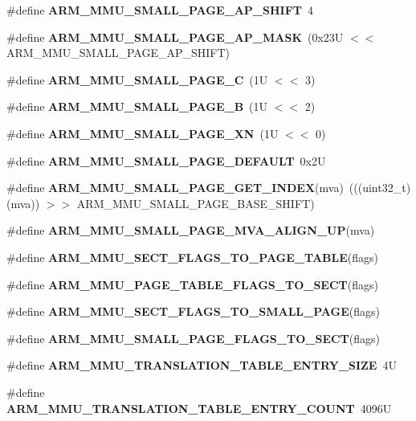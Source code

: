 \begin{Indent}
\begin{DoxyCompactItemize}
\item 
\#define {\bfseries A\+R\+M\+\_\+\+M\+M\+U\+\_\+\+S\+M\+A\+L\+L\+\_\+\+P\+A\+G\+E\+\_\+\+A\+P\+\_\+\+S\+H\+I\+FT}~4
\item 
\#define {\bfseries A\+R\+M\+\_\+\+M\+M\+U\+\_\+\+S\+M\+A\+L\+L\+\_\+\+P\+A\+G\+E\+\_\+\+A\+P\+\_\+\+M\+A\+SK}~(0x23\+U $<$$<$ A\+R\+M\+\_\+\+M\+M\+U\+\_\+\+S\+M\+A\+L\+L\+\_\+\+P\+A\+G\+E\+\_\+\+A\+P\+\_\+\+S\+H\+I\+F\+T)
\item 
\#define {\bfseries A\+R\+M\+\_\+\+M\+M\+U\+\_\+\+S\+M\+A\+L\+L\+\_\+\+P\+A\+G\+E\+\_\+C}~(1\+U $<$$<$ 3)
\item 
\#define {\bfseries A\+R\+M\+\_\+\+M\+M\+U\+\_\+\+S\+M\+A\+L\+L\+\_\+\+P\+A\+G\+E\+\_\+B}~(1\+U $<$$<$ 2)
\item 
\#define {\bfseries A\+R\+M\+\_\+\+M\+M\+U\+\_\+\+S\+M\+A\+L\+L\+\_\+\+P\+A\+G\+E\+\_\+\+XN}~(1\+U $<$$<$ 0)
\item 
\#define {\bfseries A\+R\+M\+\_\+\+M\+M\+U\+\_\+\+S\+M\+A\+L\+L\+\_\+\+P\+A\+G\+E\+\_\+\+D\+E\+F\+A\+U\+LT}~0x2U
\item 
\#define {\bfseries A\+R\+M\+\_\+\+M\+M\+U\+\_\+\+S\+M\+A\+L\+L\+\_\+\+P\+A\+G\+E\+\_\+\+G\+E\+T\+\_\+\+I\+N\+D\+EX}(mva)~(((uint32\+\_\+t) (mva)) $>$$>$ A\+R\+M\+\_\+\+M\+M\+U\+\_\+\+S\+M\+A\+L\+L\+\_\+\+P\+A\+G\+E\+\_\+\+B\+A\+S\+E\+\_\+\+S\+H\+I\+FT)
\item 
\#define {\bfseries A\+R\+M\+\_\+\+M\+M\+U\+\_\+\+S\+M\+A\+L\+L\+\_\+\+P\+A\+G\+E\+\_\+\+M\+V\+A\+\_\+\+A\+L\+I\+G\+N\+\_\+\+UP}(mva)
\item 
\#define {\bfseries A\+R\+M\+\_\+\+M\+M\+U\+\_\+\+S\+E\+C\+T\+\_\+\+F\+L\+A\+G\+S\+\_\+\+T\+O\+\_\+\+P\+A\+G\+E\+\_\+\+T\+A\+B\+LE}(flags)
\item 
\#define {\bfseries A\+R\+M\+\_\+\+M\+M\+U\+\_\+\+P\+A\+G\+E\+\_\+\+T\+A\+B\+L\+E\+\_\+\+F\+L\+A\+G\+S\+\_\+\+T\+O\+\_\+\+S\+E\+CT}(flags)
\item 
\#define {\bfseries A\+R\+M\+\_\+\+M\+M\+U\+\_\+\+S\+E\+C\+T\+\_\+\+F\+L\+A\+G\+S\+\_\+\+T\+O\+\_\+\+S\+M\+A\+L\+L\+\_\+\+P\+A\+GE}(flags)
\item 
\#define {\bfseries A\+R\+M\+\_\+\+M\+M\+U\+\_\+\+S\+M\+A\+L\+L\+\_\+\+P\+A\+G\+E\+\_\+\+F\+L\+A\+G\+S\+\_\+\+T\+O\+\_\+\+S\+E\+CT}(flags)
\item 
\#define {\bfseries A\+R\+M\+\_\+\+M\+M\+U\+\_\+\+T\+R\+A\+N\+S\+L\+A\+T\+I\+O\+N\+\_\+\+T\+A\+B\+L\+E\+\_\+\+E\+N\+T\+R\+Y\+\_\+\+S\+I\+ZE}~4U
\item 
\#define {\bfseries A\+R\+M\+\_\+\+M\+M\+U\+\_\+\+T\+R\+A\+N\+S\+L\+A\+T\+I\+O\+N\+\_\+\+T\+A\+B\+L\+E\+\_\+\+E\+N\+T\+R\+Y\+\_\+\+C\+O\+U\+NT}~4096U
$$
\end{DoxyCompactItemize}
\end{Indent}
